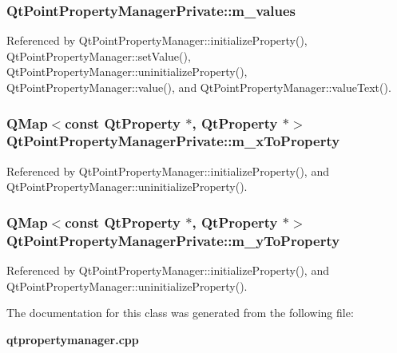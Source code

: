 \subsubsection[{m\+\_\+values}]{ Qt\+Point\+Property\+Manager\+Private\+::m\+\_\+values}\label{classQtPointPropertyManagerPrivate_aece9fd8b9ebcc9233ccf4d89c0f50c5e}


Referenced by Qt\+Point\+Property\+Manager\+::initialize\+Property(), Qt\+Point\+Property\+Manager\+::set\+Value(), Qt\+Point\+Property\+Manager\+::uninitialize\+Property(), Qt\+Point\+Property\+Manager\+::value(), and Qt\+Point\+Property\+Manager\+::value\+Text().

\subsubsection[{m\+\_\+x\+To\+Property}]{\setlength{\rightskip}{0pt plus 5cm}Q\+Map$<$const {\bf Qt\+Property} $\ast$, {\bf Qt\+Property} $\ast$$>$ Qt\+Point\+Property\+Manager\+Private\+::m\+\_\+x\+To\+Property}\label{classQtPointPropertyManagerPrivate_a8e5aa80387a716c5f5fd93d6666e1d55}


Referenced by Qt\+Point\+Property\+Manager\+::initialize\+Property(), and Qt\+Point\+Property\+Manager\+::uninitialize\+Property().

\subsubsection[{m\+\_\+y\+To\+Property}]{\setlength{\rightskip}{0pt plus 5cm}Q\+Map$<$const {\bf Qt\+Property} $\ast$, {\bf Qt\+Property} $\ast$$>$ Qt\+Point\+Property\+Manager\+Private\+::m\+\_\+y\+To\+Property}\label{classQtPointPropertyManagerPrivate_ab760e713d6c0ffe6214dd9ebf82e40ff}


Referenced by Qt\+Point\+Property\+Manager\+::initialize\+Property(), and Qt\+Point\+Property\+Manager\+::uninitialize\+Property().



The documentation for this class was generated from the following file\+:\begin{DoxyCompactItemize}
\item 
{\bf qtpropertymanager.\+cpp}\end{DoxyCompactItemize}
